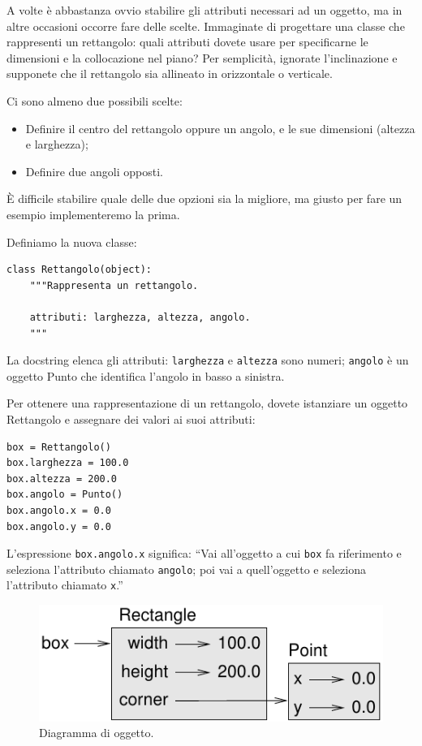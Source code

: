 \documentclass[10pt]{book}
\begin{document}
A volte è abbastanza ovvio stabilire gli attributi necessari ad un oggetto, ma in altre occasioni occorre fare delle scelte. Immaginate di progettare una classe che rappresenti un rettangolo: quali attributi dovete usare per specificarne le dimensioni e la collocazione nel piano? Per semplicità, ignorate l'inclinazione e supponete che il rettangolo sia allineato in orizzontale o verticale.

Ci sono almeno due possibili scelte: 

\begin{itemize}

\item Definire il centro del rettangolo oppure un angolo, e le sue dimensioni (altezza e larghezza);

\item Definire due angoli opposti.

\end{itemize}

È difficile stabilire quale delle due opzioni sia la migliore, ma giusto per fare un esempio implementeremo la prima.

Definiamo la nuova classe:

\begin{verbatim}
class Rettangolo(object):
    """Rappresenta un rettangolo. 

    attributi: larghezza, altezza, angolo.
    """
\end{verbatim}
%
La docstring elenca gli attributi:  {\tt larghezza} e
{\tt altezza} sono numeri; {\tt angolo} è un oggetto Punto che identifica l'angolo in basso a sinistra.

Per ottenere una rappresentazione di un rettangolo, dovete istanziare un oggetto Rettangolo e assegnare dei valori ai suoi attributi:

\begin{verbatim}
box = Rettangolo()
box.larghezza = 100.0
box.altezza = 200.0
box.angolo = Punto()
box.angolo.x = 0.0
box.angolo.y = 0.0
\end{verbatim}
%
L'espressione {\tt box.angolo.x} significa:
``Vai all'oggetto a cui {\tt box} fa riferimento e seleziona l'attributo chiamato
{\tt angolo}; poi vai a quell'oggetto e seleziona l'attributo chiamato {\tt x}.''

\begin{figure}
\centerline
{\includegraphics[scale=0.8]{figs/rectangle.pdf}}
\caption{Diagramma di oggetto.}
\label{fig.rectangle}
\end{figure}
\end{document}
